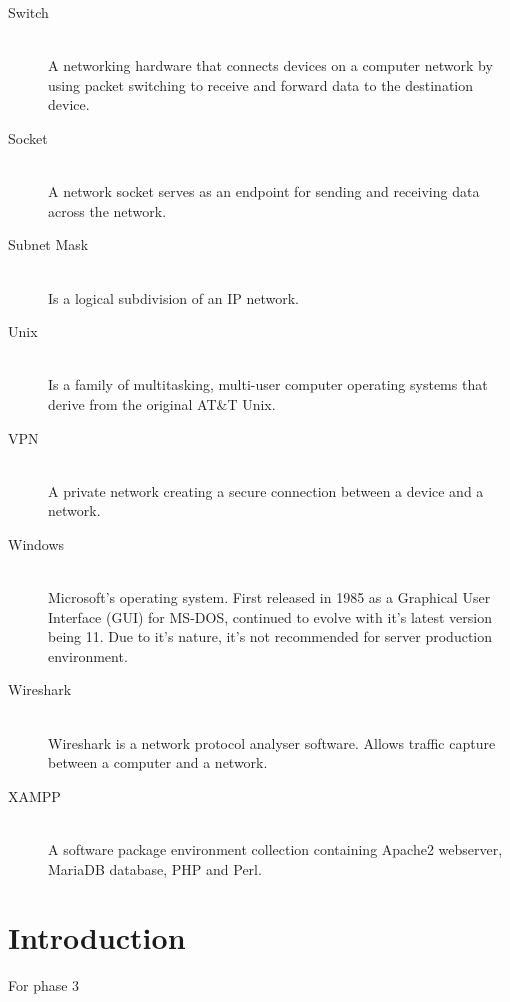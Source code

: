 \documentclass[11pt,a4paper]{report}
\begin{document}
\begin{description}
        \item[Switch] \hfill \\
            A networking hardware that connects devices on a computer network by using packet switching to receive and forward data to the destination device.
        \item[Socket] \hfill \\
            A network socket serves as an endpoint for sending and receiving data across the network.
        \item[Subnet Mask] \hfill \\
            Is a logical subdivision of an IP network.
        \item[Unix] \hfill \\
            Is a family of multitasking, multi-user computer operating systems that derive from the original AT\&T Unix.
        \item[VPN] \hfill \\
            A private network creating a secure connection between a device and a network.
        \item[Windows] \hfill \\
            Microsoft's operating system. First released in 1985 as a Graphical User Interface (GUI) for MS-DOS, continued to evolve with it's latest version being 11.
            Due to it's nature, it's not recommended for server production environment.
        \item[Wireshark] \hfill \\
            Wireshark is a network protocol analyser software. Allows traffic capture between a computer and a network.
        \item[XAMPP] \hfill \\
            A software package environment collection containing Apache2 webserver, MariaDB database, PHP and Perl.
    \end{description}

\chapter{Introduction}
    \pagestyle{fancy}
    For phase 3 

    \setcounter{page}{1}

\end{document}
